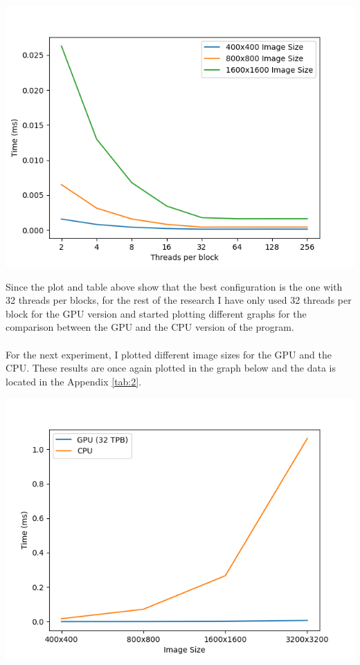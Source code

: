 \documentclass[english]{exam}
\begin{document}
\begin{center}
  \includegraphics[scale=0.6]{plot1.png}
\end{center}


\noindent
Since the plot and table above show that the best configuration is the one with 32 threads per blocks, for the rest of the research I have only used 32 threads per block for the GPU version and started plotting different graphs for the comparison between the GPU and the CPU version of the program.
\\\\
For the next experiment, I plotted different image sizes for the GPU and the CPU. These results are once again plotted in the graph below and the data is located in the Appendix \ref{tab:2}.

\begin{center}
  \includegraphics[scale=0.6]{plot2.png}
\end{center}
\end{document}
